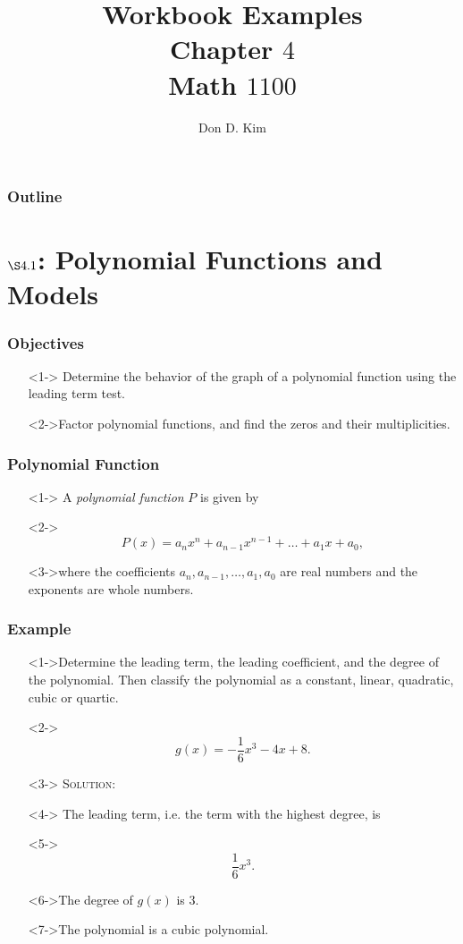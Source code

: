 \documentclass{beamer}
\title{Workbook Examples \\ Chapter $4$ \\ Math $1100$}
\author{Don D. Kim}
\date{\datefmt{\year}{\month}{\day}}
\begin{document}
\begin{frame}
	\titlepage
\end{frame}

\begin{frame}
	\frametitle{Outline}
	\tableofcontents
\end{frame}

\section{$\S 4.1$: Polynomial Functions and Models}

\begin{frame}
	\frametitle{Objectives}
	\begin{enumerate}
		\item[]<1-> Determine the behavior of the graph of a polynomial function using the leading term test.
		\item[]<2->Factor polynomial functions, and find the zeros and their multiplicities.
	\end{enumerate}
\end{frame}

\begin{frame}
	\frametitle{Polynomial Function}
	\begin{enumerate}
		\item[]<1-> A \emph{polynomial function} $P$ is given by
		\item[]<2->
		\[
			P(x)=a_{n}x^{n}+a_{n-1}x^{n-1}+\dots+a_{1}x+a_{0},
		\]
		\item[]<3->where the coefficients $a_{n}, a_{n-1}, \dots, a_{1}, a_{0}$ are real numbers and the exponents are whole numbers.
	\end{enumerate}
\end{frame}

\begin{frame}
	\frametitle{Example}
	\begin{enumerate}
		\item[]<1->Determine the leading term, the leading coefficient, and the degree of the polynomial.  Then classify the polynomial as a constant, linear, quadratic, cubic or quartic.
		\item[]<2->
		\[
			g(x)=-\frac{1}{6}x^{3}-4x+8.
		\]
		\item[]<3-> \textsc{Solution:}
		\item[]<4-> The leading term, i.e. the term with the highest degree, is
		\item[]<5-> \[ \frac{1}{6}x^{3}. \]
		\item[]<6->The degree of $g(x)$ is $3$.
		\item[]<7->The polynomial is a cubic polynomial.
	\end{enumerate}
\end{frame}
\end{document}
